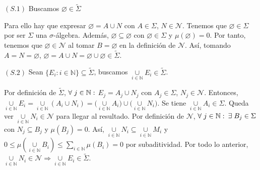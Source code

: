 \documentclass[12pt,a4paper]{article}
\newcommand{\N}{\mathbb{N}}
\newcommand{\smallcup}{\mathop{\cup}\limits}
\newcommand{\smallsum}{\mathop{\sum}\limits}
\begin{document}
\vspace{4mm} \noindent
$(S.1)$ Buscamos $\varnothing \in \tilde{\Sigma}$
\begin{adjustwidth}{0.10\textwidth}{}
    Para ello hay que expresar $\varnothing = A \cup N$ con $A \in \Sigma$, $N \in \mathcal{N}$.
    \newline \noindent
    Tenemos que $\varnothing \in \Sigma$ por ser $\Sigma$ una $\sigma$-álgebra.
    \newline \noindent
    Además, $\varnothing \subseteq \varnothing$ con $\varnothing \in \Sigma$ y $\mu(\varnothing) = 0$.
    \newline \noindent
    Por tanto, tenemos que $\varnothing \in \mathcal{N}$ al tomar $B = \varnothing$ en la definición de $\mathcal{N}$.
    \newline \noindent
    Así, tomando $A = N = \varnothing$, \hspace{1mm}$\varnothing = A \cup N= \varnothing \cup \varnothing \in \tilde{\Sigma}$.
\end{adjustwidth}
\vspace{4mm}\noindent
$(S.2)$ Sean $\{E_i : i \in \N\} \subseteq \tilde{\Sigma}$, buscamos $\smallcup_{i\in\N}E_i \in \tilde{\Sigma}$.
\begin{adjustwidth}{0.1\textwidth}{}
    Por definición de $\tilde{\Sigma}$, $\forall \hspace{1mm} j \in \N :$ $E_j = A_j \cup N_j$ con $A_j \in \Sigma$, $N_j \in \mathcal{N}$.
    \vspace{2mm}\newline\noindent
    Entonces, \hspace{1mm} $\smallcup_{i \in \N}E_i = \smallcup_{i\in\N}(A_i \cup N_i) = \big(\smallcup_{i\in\N}A_i\big)\cup\big(\smallcup_{i\in\N}N_i\big)$.
    \vspace{3mm} \newline \noindent
    Se tiene $\smallcup_{i\in\N}A_i \in \Sigma$. Queda ver $\smallcup_{i\in\N}N_i \in \mathcal{N}$ para llegar al resultado.
    \newpage \noindent
    Por definición de $\mathcal{N}$, $\forall \hspace{1mm} j \in \N :$  $\exists \hspace{1mm} B_j \in \Sigma$ con $N_j \subseteq B_j$ y $\mu(B_j) = 0$.
    \vspace{3mm} \newline \noindent
    Así, $\smallcup_{i\in\N}N_i \subseteq \smallcup_{i\in\N}M_i$ y $0 \leq \mu(\smallcup_{i\in\N}B_i) \leq \smallsum_{i\in\N}\mu(B_i) = 0$ por subaditividad.
    \vspace{2mm} \newline \noindent
    Por todo lo anterior, $\smallcup_{i\in\N}N_i \in \mathcal{N} \Rightarrow \smallcup_{i\in\N}E_i \in \tilde{\Sigma}$.
\end{adjustwidth}
\end{document}
